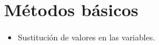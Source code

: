 \section{\large Métodos básicos}

\begin{itemize}
    \item Sustitución de valores en las variables.
\end{itemize}
